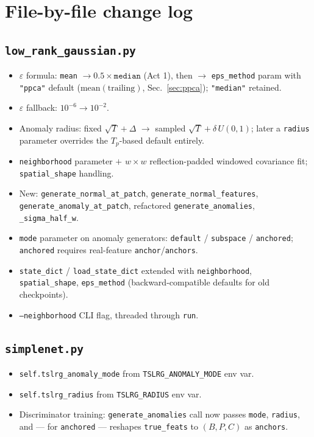 \documentclass[11pt]{article}
\newcommand{\code}[1]{\texttt{#1}}
\begin{document}
\appendix
\section{File-by-file change log}

\subsection*{\code{low\_rank\_gaussian.py}}
\begin{itemize}[noitemsep]
  \item $\varepsilon$ formula: \code{mean} $\to 0.5\times\code{median}$ (Act 1),
    then $\to$ \code{eps\_method} param with \code{"ppca"} default
    ($\mathrm{mean}(\text{trailing})$, Sec.~\ref{sec:ppca}); \code{"median"}
    retained.
  \item $\varepsilon$ fallback: $10^{-6} \to 10^{-2}$.
  \item Anomaly radius: fixed $\sqrt{T}+\Delta$ $\to$ sampled
    $\sqrt{T}+\delta\,U(0,1)$; later a \code{radius} parameter overrides the
    $T_p$-based default entirely.
  \item \code{neighborhood} parameter $+$ $w\times w$ reflection-padded windowed
    covariance fit; \code{spatial\_shape} handling.
  \item New: \code{generate\_normal\_at\_patch},
    \code{generate\_normal\_features}, \code{generate\_anomaly\_at\_patch},
    refactored \code{generate\_anomalies}, \code{\_sigma\_half\_w}.
  \item \code{mode} parameter on anomaly generators:
    \code{default} / \code{subspace} / \code{anchored}; \code{anchored} requires
    real-feature \code{anchor}/\code{anchors}.
  \item \code{state\_dict} / \code{load\_state\_dict} extended with
    \code{neighborhood}, \code{spatial\_shape}, \code{eps\_method}
    (backward-compatible defaults for old checkpoints).
  \item \code{--neighborhood} CLI flag, threaded through \code{run}.
\end{itemize}

\subsection*{\code{simplenet.py}}
\begin{itemize}[noitemsep]
  \item \code{self.tslrg\_anomaly\_mode} from \code{TSLRG\_ANOMALY\_MODE} env var.
  \item \code{self.tslrg\_radius} from \code{TSLRG\_RADIUS} env var.
  \item Discriminator training: \code{generate\_anomalies} call now passes
    \code{mode}, \code{radius}, and --- for \code{anchored} --- reshapes
    \code{true\_feats} to $(B, P, C)$ as \code{anchors}.
\end{itemize}
\end{document}
